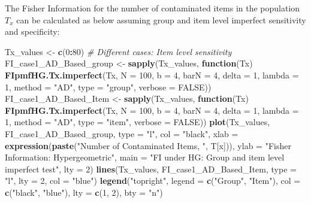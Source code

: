 \documentclass[
]{article}
\newenvironment{Shaded}{\begin{snugshade}}{\end{snugshade}}
\newcommand{\AttributeTok}[1]{\textcolor[rgb]{0.13,0.29,0.53}{#1}}
\newcommand{\CommentTok}[1]{\textcolor[rgb]{0.56,0.35,0.01}{\textit{#1}}}
\newcommand{\ConstantTok}[1]{\textcolor[rgb]{0.56,0.35,0.01}{#1}}
\newcommand{\ControlFlowTok}[1]{\textcolor[rgb]{0.13,0.29,0.53}{\textbf{#1}}}
\newcommand{\DecValTok}[1]{\textcolor[rgb]{0.00,0.00,0.81}{#1}}
\newcommand{\FunctionTok}[1]{\textcolor[rgb]{0.13,0.29,0.53}{\textbf{#1}}}
\newcommand{\NormalTok}[1]{#1}
\newcommand{\OtherTok}[1]{\textcolor[rgb]{0.56,0.35,0.01}{#1}}
\newcommand{\SpecialCharTok}[1]{\textcolor[rgb]{0.81,0.36,0.00}{\textbf{#1}}}
\newcommand{\StringTok}[1]{\textcolor[rgb]{0.31,0.60,0.02}{#1}}
\begin{document}
The Fisher Information for the number of contaminated items in the
population \(T_x\) can be calculated as below assuming group and item
level imperfect sensitivity and specificity:

\begin{Shaded}
\begin{Highlighting}[]
\NormalTok{Tx\_values }\OtherTok{\textless{}{-}} \FunctionTok{c}\NormalTok{(}\DecValTok{0}\SpecialCharTok{:}\DecValTok{80}\NormalTok{)}
\CommentTok{\# Different cases: Item level sensitivity}
\NormalTok{FI\_case1\_AD\_Based\_group }\OtherTok{\textless{}{-}} \FunctionTok{sapply}\NormalTok{(Tx\_values, }\ControlFlowTok{function}\NormalTok{(Tx) }\FunctionTok{FIpmfHG.Tx.imperfect}\NormalTok{(Tx,}
    \AttributeTok{N =} \DecValTok{100}\NormalTok{, }\AttributeTok{b =} \DecValTok{4}\NormalTok{, }\AttributeTok{barN =} \DecValTok{4}\NormalTok{, }\AttributeTok{delta =} \DecValTok{1}\NormalTok{, }\AttributeTok{lambda =} \DecValTok{1}\NormalTok{, }\AttributeTok{method =} \StringTok{"AD"}\NormalTok{,}
    \AttributeTok{type =} \StringTok{"group"}\NormalTok{, }\AttributeTok{verbose =} \ConstantTok{FALSE}\NormalTok{))}
\NormalTok{FI\_case1\_AD\_Based\_Item }\OtherTok{\textless{}{-}} \FunctionTok{sapply}\NormalTok{(Tx\_values, }\ControlFlowTok{function}\NormalTok{(Tx) }\FunctionTok{FIpmfHG.Tx.imperfect}\NormalTok{(Tx,}
    \AttributeTok{N =} \DecValTok{100}\NormalTok{, }\AttributeTok{b =} \DecValTok{4}\NormalTok{, }\AttributeTok{barN =} \DecValTok{4}\NormalTok{, }\AttributeTok{delta =} \DecValTok{1}\NormalTok{, }\AttributeTok{lambda =} \DecValTok{1}\NormalTok{, }\AttributeTok{method =} \StringTok{"AD"}\NormalTok{,}
    \AttributeTok{type =} \StringTok{"item"}\NormalTok{, }\AttributeTok{verbose =} \ConstantTok{FALSE}\NormalTok{))}
\FunctionTok{plot}\NormalTok{(Tx\_values, FI\_case1\_AD\_Based\_group, }\AttributeTok{type =} \StringTok{"l"}\NormalTok{, }\AttributeTok{col =} \StringTok{"black"}\NormalTok{,}
    \AttributeTok{xlab =} \FunctionTok{expression}\NormalTok{(}\FunctionTok{paste}\NormalTok{(}\StringTok{"Number of Contaminated Items, "}\NormalTok{,}
\NormalTok{        T[x])), }\AttributeTok{ylab =} \StringTok{"Fisher Information: Hypergeometric"}\NormalTok{,}
    \AttributeTok{main =} \StringTok{"FI under HG: Group and item level imperfect test"}\NormalTok{,}
    \AttributeTok{lty =} \DecValTok{2}\NormalTok{)}
\FunctionTok{lines}\NormalTok{(Tx\_values, FI\_case1\_AD\_Based\_Item, }\AttributeTok{type =} \StringTok{"l"}\NormalTok{, }\AttributeTok{lty =} \DecValTok{2}\NormalTok{,}
    \AttributeTok{col =} \StringTok{"blue"}\NormalTok{)}
\FunctionTok{legend}\NormalTok{(}\StringTok{"topright"}\NormalTok{, }\AttributeTok{legend =} \FunctionTok{c}\NormalTok{(}\StringTok{"Group"}\NormalTok{, }\StringTok{"Item"}\NormalTok{), }\AttributeTok{col =} \FunctionTok{c}\NormalTok{(}\StringTok{"black"}\NormalTok{,}
    \StringTok{"blue"}\NormalTok{), }\AttributeTok{lty =} \FunctionTok{c}\NormalTok{(}\DecValTok{1}\NormalTok{, }\DecValTok{2}\NormalTok{), }\AttributeTok{bty =} \StringTok{"n"}\NormalTok{)}
\end{Highlighting}
\end{Shaded}
\end{document}
